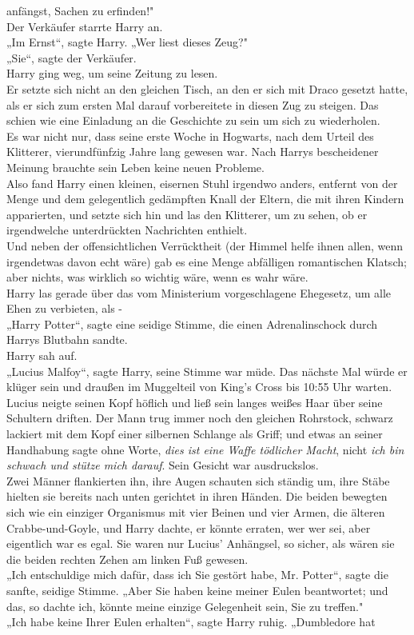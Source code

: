 {anfängst, Sachen zu erfinden!"\\ Der Verkäufer starrte Harry an.\\ „Im Ernst“, sagte Harry. „Wer liest dieses Zeug?"\\ „Sie“, sagte der Verkäufer.\\ Harry ging weg, um seine Zeitung zu lesen.\\ Er setzte sich nicht an den gleichen Tisch, an den er sich mit Draco gesetzt hatte, als er sich zum ersten Mal darauf vorbereitete in diesen Zug zu steigen. Das schien wie eine Einladung an die Geschichte zu sein um sich zu wiederholen.\\ Es war nicht nur, dass seine erste Woche in Hogwarts, nach dem Urteil des Klitterer, vierundfünfzig Jahre lang gewesen war. Nach Harrys bescheidener Meinung brauchte sein Leben keine neuen Probleme.\\ Also fand Harry einen kleinen, eisernen Stuhl irgendwo anders, entfernt von der Menge und dem gelegentlich gedämpften Knall der Eltern, die mit ihren Kindern apparierten, und setzte sich hin und las den Klitterer, um zu sehen, ob er irgendwelche unterdrückten Nachrichten enthielt.\\ Und neben der offensichtlichen Verrücktheit (der Himmel helfe ihnen allen, wenn irgendetwas davon echt wäre) gab es eine Menge abfälligen romantischen Klatsch; aber nichts, was wirklich so wichtig wäre, wenn es wahr wäre.\\ Harry las gerade über das vom Ministerium vorgeschlagene Ehegesetz, um alle Ehen zu verbieten, als -\\ „Harry Potter“, sagte eine seidige Stimme, die einen Adrenalinschock durch Harrys Blutbahn sandte.\\ Harry sah auf.\\ „Lucius Malfoy“, sagte Harry, seine Stimme war müde. Das nächste Mal würde er klüger sein und draußen im Muggelteil von King's Cross bis 10:55 Uhr warten.\\ Lucius neigte seinen Kopf höflich und ließ sein langes weißes Haar über seine Schultern driften. Der Mann trug immer noch den gleichen Rohrstock, schwarz lackiert mit dem Kopf einer silbernen Schlange als Griff; und etwas an seiner Handhabung sagte ohne Worte, \emph{dies ist eine Waffe tödlicher Macht}, nicht \emph{ich bin schwach und stütze mich darauf}. Sein Gesicht war ausdruckslos.\\ Zwei Männer flankierten ihn, ihre Augen schauten sich ständig um, ihre Stäbe hielten sie bereits nach unten gerichtet in ihren Händen. Die beiden bewegten sich wie ein einziger Organismus mit vier Beinen und vier Armen, die älteren Crabbe-und-Goyle, und Harry dachte, er könnte erraten, wer wer sei, aber eigentlich war es egal. Sie waren nur Lucius' Anhängsel, so sicher, als wären sie die beiden rechten Zehen am linken Fuß gewesen.\\ „Ich entschuldige mich dafür, dass ich Sie gestört habe, Mr. Potter“, sagte die sanfte, seidige Stimme. „Aber Sie haben keine meiner Eulen beantwortet; und das, so dachte ich, könnte meine einzige Gelegenheit sein, Sie zu treffen."\\ „Ich habe keine Ihrer Eulen erhalten“, sagte Harry ruhig. „Dumbledore hat }
